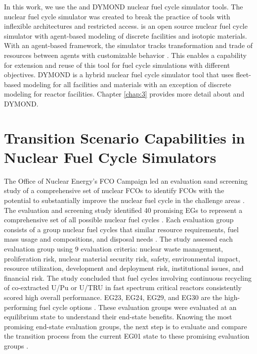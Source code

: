 In this work, we use the \Cyclus and DYMOND nuclear fuel cycle simulator tools. 
The \Cyclus nuclear fuel cycle simulator was created to break the practice of 
tools with inflexible architectures and restricted access.
\Cyclus is an open source nuclear fuel cycle simulator with agent-based 
modeling of discrete facilities and isotopic materials. 
With an agent-based framework, the simulator tracks transformation and 
trade of resources between agents with customizable behavior
\cite{huff_fundamental_2016}. 
This enables a capability for extension and reuse of this tool for fuel cycle 
simulations with different objectives. 
DYMOND is a hybrid nuclear fuel cycle simulator tool that uses fleet-based 
modeling for all facilities and materials 
with an exception of discrete modeling for reactor facilities. 
Chapter \ref{chap:3} provides more detail about \Cyclus and DYMOND. 

\section{Transition Scenario Capabilities in Nuclear Fuel Cycle Simulators}
The Office of Nuclear Energy's
\gls{FCO} Campaign led an evaluation 
sand screening study of a comprehensive set of nuclear \glspl{FCO} 
to identify \glspl{FCO} with the potential to substantially 
improve the nuclear fuel cycle in the challenge areas
\cite{wigeland_nuclear_2014}. 
The evaluation and screening study identified 40 promising 
\glspl{EG} to represent a comprehensive set of 
all possible nuclear fuel cycles \cite{wigeland_nuclear_2014}. 
Each evaluation group consists of a group nuclear fuel cycles that
similar resource requirements, fuel mass usage and compositions, 
and disposal needs \cite{wigeland_nuclear_2014}. 
The study assessed each evaluation group using 
9 evaluation criteria: nuclear waste management, 
proliferation risk, nuclear material security risk, 
safety, environmental impact, resource utilization, 
development and deployment risk, institutional issues, and 
financial risk.  
The study concluded that fuel cycles
involving continuous recycling of co-extracted U/Pu or U/TRU in 
fast spectrum critical reactors consistently scored high overall 
performance.
EG23, EG24, EG29, and EG30 are the high-performing fuel cycle options
\cite{wigeland_nuclear_2014}.
These evaluation groups were evaluated at an equilibrium state to 
understand their end-state benefits.
Knowing the most promising end-state evaluation groups,
the next step is to evaluate and compare the transition process 
from the current EG01 
state to these promising evaluation groups \cite{feng_standardized_2016}. 

